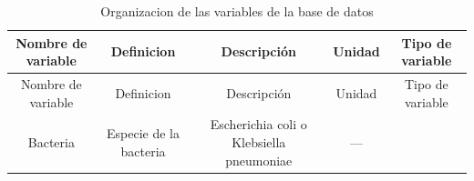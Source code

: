 \documentclass[
]{article}
\begin{document}
\begin{longtable}[]{@{}ccccc@{}}
\caption{Organizacion de las variables de la base de
datos}\tabularnewline
\toprule
\begin{minipage}[b]{0.16\columnwidth}\centering
Nombre de variable\strut
\end{minipage} & \begin{minipage}[b]{0.21\columnwidth}\centering
Definicion\strut
\end{minipage} & \begin{minipage}[b]{0.24\columnwidth}\centering
Descripción\strut
\end{minipage} & \begin{minipage}[b]{0.07\columnwidth}\centering
Unidad\strut
\end{minipage} & \begin{minipage}[b]{0.18\columnwidth}\centering
Tipo de variable\strut
\end{minipage}\tabularnewline
\midrule
\endfirsthead
\toprule
\begin{minipage}[b]{0.16\columnwidth}\centering
Nombre de variable\strut
\end{minipage} & \begin{minipage}[b]{0.21\columnwidth}\centering
Definicion\strut
\end{minipage} & \begin{minipage}[b]{0.24\columnwidth}\centering
Descripción\strut
\end{minipage} & \begin{minipage}[b]{0.07\columnwidth}\centering
Unidad\strut
\end{minipage} & \begin{minipage}[b]{0.18\columnwidth}\centering
Tipo de variable\strut
\end{minipage}\tabularnewline
\midrule
\endhead
\begin{minipage}[t]{0.16\columnwidth}\centering
Bacteria\strut
\end{minipage} & \begin{minipage}[t]{0.21\columnwidth}\centering
Especie de la bacteria\strut
\end{minipage} & \begin{minipage}[t]{0.24\columnwidth}\centering
Escherichia coli o Klebsiella pneumoniae\strut
\end{minipage} & \begin{minipage}[t]{0.07\columnwidth}\centering
---\strut
\end{minipage} & \begin{minipage}[t]{0.18\columnwidth}\centering

\end{minipage}
\end{longtable}
\end{document}
